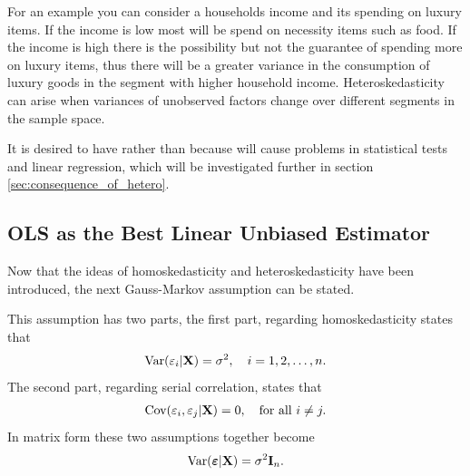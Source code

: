 For an example you can consider a households income and its spending on luxury items. If the income is low most will be spend on necessity items such as food. 
If the income is high there is the possibility but not the guarantee of spending more on luxury items, thus there will be a greater variance in the consumption of luxury goods in the segment with higher household income.
Heteroskedasticity can arise when variances of unobserved factors change over different segments in the sample space. 

It is desired to have \homo rather than \hetero because \hetero will cause problems in statistical tests and linear regression, which will be investigated further in section \ref{sec:consequence_of_hetero}. 

\subsection{OLS as the Best Linear Unbiased Estimator}
Now that the ideas of homoskedasticity and heteroskedasticity have been introduced, the next Gauss-Markov assumption can be stated.
\begin{assumption}\label{as:homoskedasticity_and_no_serial_correlation}
    This assumption has two parts, the first part, regarding homoskedasticity states that
    \begin{align*}
       \operatorname{\text{Var}}(\varepsilon_i | \mathbf{X}) = \sigma^2, \quad i = 1,2, \ldots, n.
    \end{align*}
    The second part, regarding serial correlation, states that
    \begin{align*}
        \operatorname{\text{Cov}}(\varepsilon_i, \varepsilon_j | \mathbf{X}) = 0, \quad \text{for all} \ i \neq j.
    \end{align*}
    In matrix form these two assumptions together become
    \begin{align*}
        \operatorname{\text{Var}}(\boldsymbol{\varepsilon} | \mathbf{X}) = \sigma^2\mathbf{I}_{n}.
    \end{align*}
\end{assumption}

